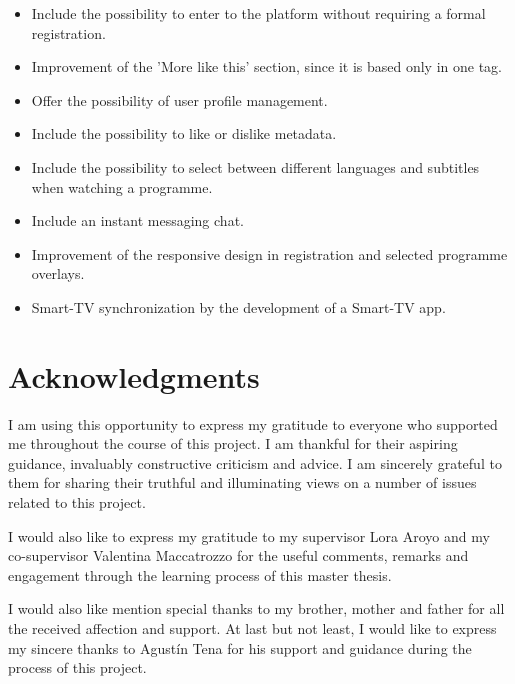 \documentclass{acm_proc_article-sp}
\begin{document}
\begin{itemize}
	\item Include the possibility to enter to the platform without requiring a formal registration. 
	\item Improvement of the 'More like this' section, since it is based only in one tag.
	\item Offer the possibility of user profile management.
	\item Include the possibility to like or dislike metadata.
	\item Include the possibility to select between different languages and subtitles when watching a programme.
	\item Include an instant messaging chat.
	\item Improvement of the responsive design in registration and selected programme overlays.
	\item Smart-TV synchronization by the development of a Smart-TV app.
\end{itemize}


\section{Acknowledgments}
I am using this opportunity to express my gratitude to everyone who supported me throughout the course of this project. I am thankful for their aspiring guidance, invaluably constructive criticism and advice. I am sincerely grateful to them for sharing their truthful and illuminating views on a number of issues related to this project.

I would also like to express my gratitude to my supervisor Lora Aroyo and my co-supervisor Valentina Maccatrozzo for the useful comments, remarks and engagement through the learning process of this master thesis. 

I would also like mention special thanks to my brother, mother and father for all the received affection and support. At last but not least, I would like to express my sincere thanks to Agust\'in Tena for his support and guidance during the process of this project. 

%

%
%
\end{document}
